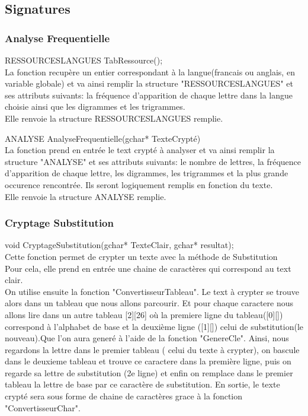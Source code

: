 \documentclass[a4]{article}
\begin{document}
		\subsection{Signatures}
		
	
	\subsubsection{Analyse Frequentielle}
	RESSOURCESLANGUES TabRessource();\\
		La fonction recupère un entier correspondant à la langue(francais ou anglais, en variable globale)
		et va ainsi remplir la structure "RESSOURCESLANGUES" et ses attributs suivants:
		la fréquence d'apparition de chaque lettre dans la langue choisie ainsi que les digrammes
		et les trigrammes.\\
		Elle renvoie la structure RESSOURCESLANGUES remplie.
		
	ANALYSE AnalyseFrequentielle(gchar* TexteCrypté)\\
		La fonction prend en entrée le text crypté à analyser et va ainsi remplir la structure "ANALYSE" et 
		ses attributs suivants:
		le nombre de lettres, la fréquence d'apparition de chaque lettre, les digrammes, les trigrammes
		et la plus grande occurence rencontrée. Ils seront logiquement remplis en fonction du texte.\\
		Elle renvoie la structure ANALYSE remplie.\\
		
	\subsubsection{Cryptage Substitution}
	void CryptageSubstitution(gchar* TexteClair, gchar* resultat);\\
		Cette fonction permet de crypter un texte avec la méthode de Substitution\\
		Pour cela, elle prend en entrée une chaine de caractères qui correspond au text clair.\\
		On utilise ensuite la fonction "ConvertisseurTableau".
		Le text à crypter se trouve alors dans un tableau que nous allons parcourir. Et pour chaque caractere 
		nous allons lire dans un autre tableau [2][26] où la premiere ligne du tableau([0][]) correspond à l'alphabet
		de base et la deuxième ligne ([1][]) celui de substitution(le nouveau).Que l'on aura generé à l'aide de la fonction "GenereCle". Ainsi, nous regardons la lettre dans 
		le premier tableau ( celui du texte à crypter), on bascule dans le deuxieme tableau et trouve ce caractere dans la première ligne, puis on regarde sa lettre de substitution (2e ligne) et enfin on remplace dans le premier tableau 
		la lettre de base par ce caractère de substitution. En sortie, le texte crypté sera sous forme de chaine de caractères grace à la fonction "ConvertisseurChar".
		
\end{document}
